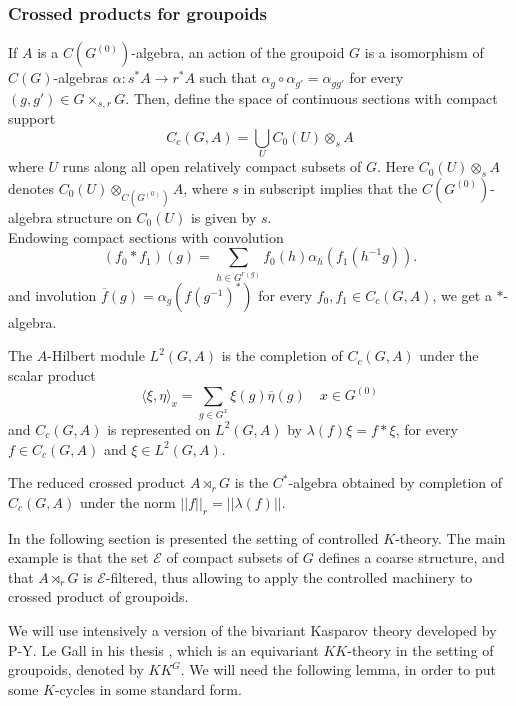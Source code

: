 \subsubsection{Crossed products for groupoids}

If $A$ is a $C(G^{(0)})$-algebra, an action of the groupoid $G$ is a isomorphism of $C(G)$-algebras $\alpha : s^* A \rightarrow r^* A$ such that $\alpha_g \circ \alpha_{g'} = \alpha_{gg'}$ for every $(g,g')\in G\times_{s,r} G$. Then, define the space of continuous sections with compact support 
\[C_c(G,A) = \bigcup_{U} C_0(U)\otimes_s A\]
where $U$ runs along all open relatively compact subsets of $G$. Here $C_0(U)\otimes_s A$ denotes $C_0(U)\otimes_{C(G^{(0)})} A$, where $s$ in subscript implies that the $C(G^{(0)})$-algebra structure on $C_0(U)$ is given by $s$.\\

Endowing compact sections with convolution
\[(f_0\ast f_1)(g) = \sum_{h\in G^{r(g)}} f_0(h) \alpha_h(f_1(h^{-1}g)).\]
and involution $\overline f(g)=\alpha_g(f(g^{-1})^*)$ for every $f_0,f_1\in C_c(G,A)$, we get a $*$-algebra. 

The $A$-Hilbert module $L^2(G,A)$ is the completion of $C_c(G,A)$ under the scalar product 
\[\langle \xi ,\eta \rangle_x  = \sum_{g\in G^x} \xi(g)\overline \eta(g) \quad x\in G^{(0)} \]
and $C_c(G,A)$ is represented on $L^2(G,A)$ by $\lambda(f) \xi = f\ast \xi$, for every $ f\in C_c(G,A)$ and $\xi\in L^2(G,A)$.\\

\begin{definition}
The reduced crossed product $A\rtimes_r G$ is the $C^*$-algebra obtained by completion of $C_c(G,A)$ under the norm $||f||_r=||\lambda(f)||$.
\end{definition}

In the following section is presented the setting of controlled $K$-theory. The main example is that the set $\mathcal E$ of compact subsets of $G$ defines a coarse structure, and that $A\rtimes_r G$ is $\mathcal E$-filtered, thus allowing to apply the controlled machinery to crossed product of groupoids. 

We will use intensively a version of the bivariant Kasparov theory developed by P-Y. Le Gall in his thesis \cite{LeGall}, which is an equivariant $KK$-theory in the setting of groupoids, denoted by $KK^G$. We will need the following lemma, in order to put some $K$-cycles in some standard form.\\

